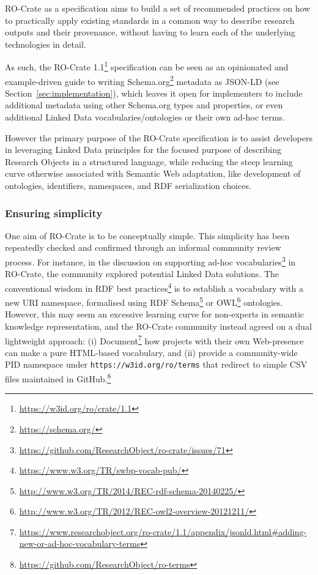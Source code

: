 \documentclass[ds,v1.1.2,openaccess]{iosart2x}%
\begin{document}
\label{sec:recommendedpractices}

RO-Crate as a specification aims to build a set of recommended
practices on how to practically apply existing standards in a common
way to describe research outputs and their provenance, without having
to learn each of the underlying technologies in detail.

As such, the RO-Crate 1.1\footnote{\url{https://w3id.org/ro/crate/1.1}}
specification \cite{doi:10.5281/zenodo.4541002} can be seen as an
opinionated and example-driven guide to writing
Schema.org\footnote{\url{https://schema.org/}} \cite{doi:10.1145/2857274.2857276}
metadata as JSON-LD \cite{sporny_2014} (see Section~\ref{sec:implementation}), which leaves it open for implementers to include
additional metadata using other Schema.org types and properties, or
even additional Linked Data vocabularies/ontologies or their own ad-hoc terms.

However the primary purpose of the RO-Crate specification is to assist
developers in leveraging Linked Data principles for the focused purpose
of describing Research Objects in a structured language, while reducing
the steep learning curve otherwise associated with Semantic Web
adaptation, like development of ontologies, identifiers, namespaces,
and RDF serialization choices.
\subsubsection{Ensuring simplicity}%

\label{sec:implicitly}

One aim of RO-Crate is to be conceptually simple. This simplicity has
been repeatedly checked and confirmed through an informal community
review process. For instance, in the discussion on supporting ad-hoc
vocabularies\footnote{\url{https://github.com/ResearchObject/ro-crate/issues/71}} in
RO-Crate, the community explored potential Linked Data solutions. The
conventional wisdom in RDF best
practices\footnote{\url{https://www.w3.org/TR/swbp-vocab-pub/}} is to establish a
vocabulary with a new URI namespace, formalised using RDF
Schema\footnote{\url{http://www.w3.org/TR/2014/REC-rdf-schema-20140225/}} or
OWL\footnote{\url{http://www.w3.org/TR/2012/REC-owl2-overview-20121211/}}
ontologies. However, this may seem an excessive learning curve for
non-experts in semantic knowledge representation, and the RO-Crate
community instead agreed on a dual lightweight approach: (i)
Document\footnote{\url{https://www.researchobject.org/ro-crate/1.1/appendix/jsonld.html\#adding-new-or-ad-hoc-vocabulary-terms}}
how projects with their own Web-presence can make a pure HTML-based
vocabulary, and (ii) provide a community-wide PID namespace under
\texttt{https://w3id.org/ro/terms} that redirect to simple CSV files
maintained in GitHub.\footnote{\url{https://github.com/ResearchObject/ro-terms}}
\end{document}
